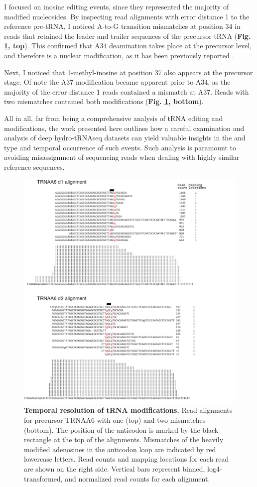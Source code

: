 \documentclass[12pt]{rockefeller}
\begin{document}
I focused on inosine editing events, since they represented the majority of modified nucleosides. By inspecting read alignments with error distance 1 to the reference pre-tRNA, I noticed A-to-G transition mismatches at position 34 in reads that retained the leader and trailer sequences of the precursor tRNA (\textbf{Fig. \ref{paper7b}, top}). 
This confirmed that A34 deamination takes place at the precursor level, and therefore is a nuclear modification, as it has been previously reported \cite{Torres:2015ed}. 

Next, I noticed that 1-methyl-inosine at position 37 also appears at the precursor stage. Of note the A37 modification became apparent prior to A34, as the majority of the error distance 1 reads contained a mismatch at A37. Reads with two mismatches contained both modifications (\textbf{Fig. \ref{paper7b}, bottom}).

All in all, far from being a comprehensive analysis of tRNA editing and modifications, the work presented here outlines how a careful examination and analysis of deep hydro-tRNAseq datasets can yield valuable insights in the and type and temporal occurrence of such events. Such analysis is paramount to avoiding misassignment of sequencing reads when dealing with highly similar reference sequences. 

\begin{figure}[!ht]%
\centering
\includegraphics[width = 5in]{paper7b.png}%
\caption[Temporal resolution of tRNA modifications]
{\textbf{Temporal resolution of tRNA modifications.}
Read alignments for precursor TRNAA6 with one (top) and two mismatches (bottom). The position of the anticodon is marked by the black rectangle at the top of the alignments. Mismatches of the heavily modified adenosines in the anticodon loop are indicated by red lowercase letters. Read counts and mapping locations for each read are shown on the right side. Vertical bars represent binned, log4-transformed, and normalized read counts for each alignment.}
\centering
\label{paper7b}%
\end{figure}
\end{document}
